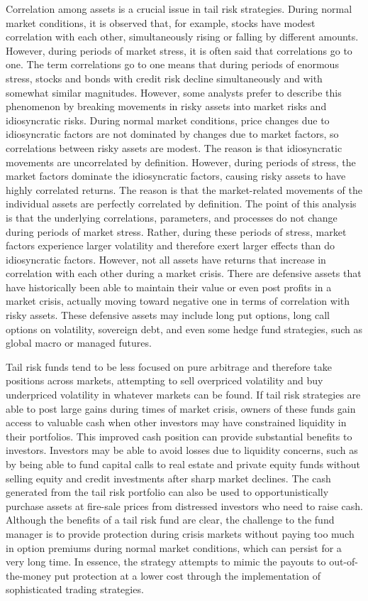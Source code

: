 \documentclass[11pt]{article}
\begin{document}
Correlation among assets is a crucial issue in tail risk strategies. During normal market conditions, it is observed that, for example, stocks have modest correlation with each other, simultaneously rising or falling by different amounts. However, during periods of market stress, it is often said that correlations go to one. The term correlations go to one means that during periods of enormous stress, stocks and bonds with credit risk decline simultaneously and with somewhat similar magnitudes. However, some analysts prefer to describe this phenomenon by breaking movements in risky assets into market risks and idiosyncratic risks. During normal market conditions, price changes due to idiosyncratic factors are not dominated by changes due to market factors, so correlations between risky assets are modest. The reason is that idiosyncratic movements are uncorrelated by definition. However, during periods of stress, the market factors dominate the idiosyncratic factors, causing risky assets to have highly correlated returns. The reason is that the market-related movements of the individual assets are perfectly correlated by definition. The point of this analysis is that the underlying correlations, parameters, and processes do not change during periods of market stress. Rather, during these periods of stress, market factors experience larger volatility and therefore exert larger effects than do idiosyncratic factors. However, not all assets have returns that increase in correlation with each other during a market crisis. There are defensive assets that have historically been able to maintain their value or even post profits in a market crisis, actually moving toward negative one in terms of correlation with risky assets. These defensive assets may include long put options, long call options on volatility, sovereign debt, and even some hedge fund strategies, such as global macro or managed futures.

Tail risk funds tend to be less focused on pure arbitrage and therefore take positions across markets, attempting to sell overpriced volatility and buy underpriced volatility in whatever markets can be found. If tail risk strategies are able to post large gains during times of market crisis, owners of these funds gain access to valuable cash when other investors may have constrained liquidity in their portfolios. This improved cash position can provide substantial benefits to investors. Investors may be able to avoid losses due to liquidity concerns, such as by being able to fund capital calls to real estate and private equity funds without selling equity and credit investments after sharp market declines. The cash generated from the tail risk portfolio can also be used to opportunistically purchase assets at fire-sale prices from distressed investors who need to raise cash. Although the benefits of a tail risk fund are clear, the challenge to the fund manager is to provide protection during crisis markets without paying too much in option premiums during normal market conditions, which can persist for a very long time. In essence, the strategy attempts to mimic the payouts to out-of-the-money put protection at a lower cost through the implementation of sophisticated trading strategies.
\end{document}
